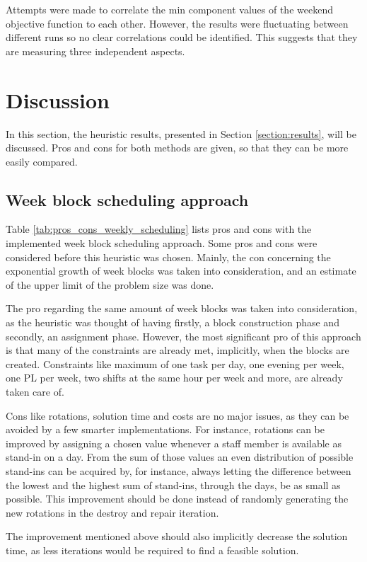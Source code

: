 Attempts were made to correlate the min component values of the weekend objective function to each other. However, the results were fluctuating between different runs so no clear correlations could be identified. This suggests that they are measuring three independent aspects.

\section{Discussion}\label{section:discussion}
In this section, the heuristic results, presented in Section \ref{section:results}, will be discussed. Pros and cons for both methods are given, so that they can be more easily compared.


\subsection{Week block scheduling approach}
Table \ref{tab:pros_cons_weekly_scheduling} lists pros and cons with the implemented week block scheduling approach. Some pros and cons were considered before this heuristic was chosen. Mainly, the con concerning the exponential growth of week blocks was taken into consideration, and an estimate of the upper limit of the problem size was done.

The pro regarding the same amount of week blocks was taken into consideration, as the heuristic was thought of having firstly, a block construction phase and secondly, an assignment phase. However, the most significant pro of this approach is that many of the constraints are already met, implicitly, when the blocks are created. Constraints like maximum of one task per day, one evening per week, one PL per week, two shifts at the same hour per week and more, are already taken care of. 

Cons like rotations, solution time and costs are no major issues, as they can be avoided by a few smarter implementations. For instance, rotations can be improved by assigning a chosen value whenever a staff member is available as stand-in on a day. From the sum of those values an even distribution of possible stand-ins can be acquired by, for instance, always letting the difference between the lowest and the highest sum of stand-ins, through the days, be as small as possible. This improvement should be done instead of randomly generating the new rotations in the destroy and repair iteration. 

The improvement mentioned above should also implicitly decrease the solution time, as less iterations would be required to find a feasible solution.

